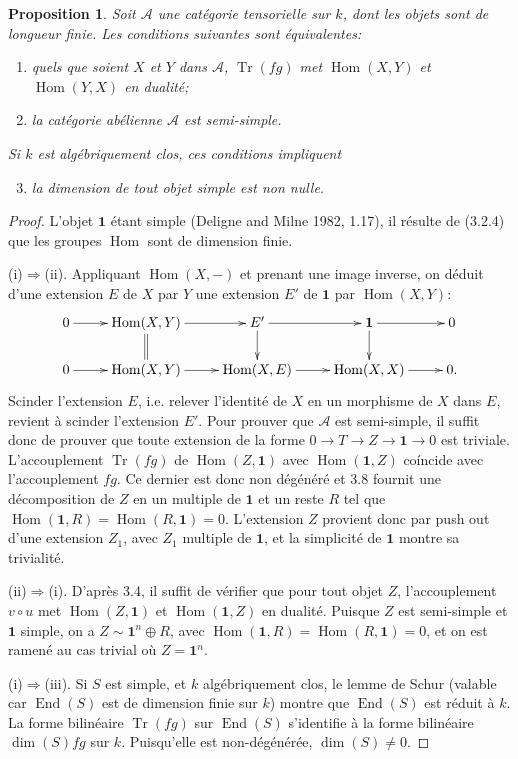 \documentclass[11pt,a4paper]{article}
\theoremstyle{plain}
\newtheorem{proposition}[theorem]{Proposition}
\theoremstyle{definition}
\DeclareMathOperator{\Hom}{Hom}
\DeclareMathOperator{\End}{End}
\DeclareMathOperator{\Tr}{Tr}
\begin{document}
\begin{proposition}
Soit $\mathcal{A}$ une cat\'egorie tensorielle sur $k$, dont les objets sont de longueur finie. Les conditions suivantes sont \'equivalentes:
\begin{enumerate}[label=(\roman*)]
\item quels que soient $X$ et $Y$ dans $\mathcal{A}$, $\Tr(fg)$ met $\Hom(X, Y)$ et $\Hom(Y, X)$ en dualit\'e;
\item la cat\'egorie ab\'elienne $\mathcal{A}$ est semi-simple.
\end{enumerate}
Si $k$ est alg\'ebriquement clos, ces conditions impliquent
\begin{enumerate}[label=(\roman*)]
\setcounter{enumi}{2}
\item la dimension de tout objet simple est non nulle.
\end{enumerate}
\end{proposition}

\begin{proof}
L'objet $\mathbf{1}$ \'etant simple (Deligne and Milne 1982, 1.17), il r\'esulte de (3.2.4) que les groupes $\Hom$ sont de dimension finie.

(i)$\Rightarrow$(ii). Appliquant $\Hom(X, -)$ et prenant une image inverse, on d\'eduit d'une extension $E$ de $X$ par $Y$ une extension $E'$ de $\mathbf{1}$ par $\Hom(X, Y)$:
\[
\xymatrix@R=1.5pc{
0 \ar[r] & \Hom(X, Y) \ar[r] \ar@{=}[d] & E' \ar[r] \ar[d] & \mathbf{1} \ar[r] \ar[d] & 0 \\
0 \ar[r] & \Hom(X, Y) \ar[r] & \Hom(X, E) \ar[r] & \Hom(X, X) \ar[r] & 0.
}
\]
Scinder l'extension $E$, i.e. relever l'identit\'e de $X$ en un morphisme de $X$ dans $E$, revient \`a scinder l'extension $E'$. Pour prouver que $\mathcal{A}$ est semi-simple, il suffit donc de prouver que toute extension de la forme $0 \to T \to Z \to \mathbf{1} \to 0$ est triviale. L'accouplement $\Tr(fg)$ de $\Hom(Z, \mathbf{1})$ avec $\Hom(\mathbf{1}, Z)$ co\'incide avec l'accouplement $fg$. Ce dernier est donc non d\'eg\'en\'er\'e et 3.8 fournit une d\'ecomposition de $Z$ en un multiple de $\mathbf{1}$ et un reste $R$ tel que $\Hom(\mathbf{1}, R) = \Hom(R, \mathbf{1}) = 0$. L'extension $Z$ provient donc par push out d'une extension $Z_1$, avec $Z_1$ multiple de $\mathbf{1}$, et la simplicit\'e de $\mathbf{1}$ montre sa trivialit\'e.

(ii)$\Rightarrow$(i). D'apr\`es 3.4, il suffit de v\'erifier que pour tout objet $Z$, l'accouplement $v \circ u$ met $\Hom(Z, \mathbf{1})$ et $\Hom(\mathbf{1}, Z)$ en dualit\'e. Puisque $Z$ est semi-simple et $\mathbf{1}$ simple, on a $Z \sim \mathbf{1}^n \oplus R$, avec $\Hom(\mathbf{1}, R) = \Hom(R, \mathbf{1}) = 0$, et on est ramen\'e au cas trivial o\`u $Z = \mathbf{1}^n$.

(i)$\Rightarrow$(iii). Si $S$ est simple, et $k$ alg\'ebriquement clos, le lemme de Schur (valable car $\End(S)$ est de dimension finie sur $k$) montre que $\End(S)$ est r\'eduit \`a $k$. La forme bilin\'eaire $\Tr(fg)$ sur $\End(S)$ s'identifie \`a la forme bilin\'eaire $\dim(S) fg$ sur $k$. Puisqu'elle est non-d\'eg\'en\'er\'ee, $\dim(S) \neq 0$.
\end{proof}
\end{document}
